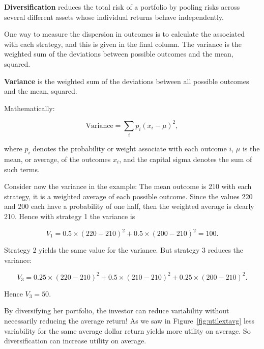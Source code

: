 \begin{DefBox}
\textbf{Diversification} reduces the total risk of a portfolio by pooling risks across several different assets whose individual returns behave independently.
\end{DefBox}

One way to measure the dispersion in outcomes is to calculate the  associated with each strategy, and this is given in the final column. The variance is the weighted sum of the deviations between possible outcomes and the mean, squared. 

\begin{DefBox}
\textbf{Variance} is the weighted sum of the deviations between all possible outcomes and the mean, squared.
\end{DefBox}

Mathematically:

\begin{equation*}
\text{Variance}=\sum_i p_i(x_i-\mu)^2,
\end{equation*}

where $p_i$ denotes the probability or weight associate with each outcome $i$,  $\mu$ is the mean, or average, of the outcomes $x_i$, and the capital sigma denotes the sum of such terms. 

Consider now the variance in the example: The mean outcome is 210 with each strategy, it is a weighted average of each possible outcome. Since the values 220 and 200 each have a probability of one half, then the weighted average is clearly 210.  Hence with strategy 1 the variance is 

\begin{equation*}
V_1=0.5\times(220-210)^2+0.5\times(200-210)^2=100.
\end{equation*}

Strategy 2 yields the same value for the variance. But strategy 3 reduces the variance: 

\begin{equation*}
V_3=0.25\times(220-210)^2+0.5\times(210-210)^2+0.25\times(200-210)^2.
\end{equation*}

Hence $V_3=50$.

By diversifying her portfolio, the investor can reduce variability without necessarily reducing the average return! As we saw in Figure~\ref{fig:utilextavg} less variability for the same average dollar return yields more utility on average. So diversification can increase utility on average.

